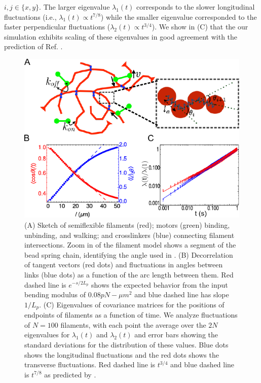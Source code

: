 \documentclass[11pt]{article}
\begin{document}
$i,j\in\{x,y\}$.
The larger eigenvalue $\lambda_1(t)$ corresponds to the slower longitudinal fluctuations
(i.e., $\lambda_1(t)\propto t^{7/8}$) while the smaller eigenvalue corresponded to the faster perpendicular fluctuations
($\lambda_2(t)\propto t^{3/4}$). We show  in (C) that the our simulation exhibits scaling of these eigenvalues in good agreement with the prediction of Ref. \cite{everaers1999}.
\begin{figure}[H] 
  \centering
   \includegraphics[scale=1]{figs/filament/pl_fig.pdf}
  \caption{\label{fig:filament}
 (A) Sketch of semiflexible filaments (red); motors (green) binding, unbinding, and walking; and crosslinkers (blue) connecting filament intersections. Zoom in of the filament model shows a segment of the bead spring chain, identifying the angle used in .
  (B) Decorrelation of tangent vectors (red dots) and fluctuations in angles between links (blue dots) 
  as a function of the arc length between them. Red dashed
  line is $e^{-s/2L_p}$ shows the expected behavior from the input bending modulus of $0.08 pN-\mu m^2$ and blue
  dashed line has slope $1/L_p$.
  (C) Eigenvalues of covariance matrices for the positions of endpoints of filaments as a function of time. We analyze fluctuations of $N=100$ filaments, with each point the average over the $2N$ eigenvalues for $\lambda_1(t)$ and $\lambda_2(t)$ and error bars showing the standard deviations for the
distribution of these values. Blue
  dots shows the longitudinal fluctuations and the red dots shows the transverse fluctuations. Red dashed line is
  $t^{3/4}$ and blue dashed line is $t^{7/8}$ as predicted by \cite{everaers1999}. 
}
\end{figure} 
\end{document}
